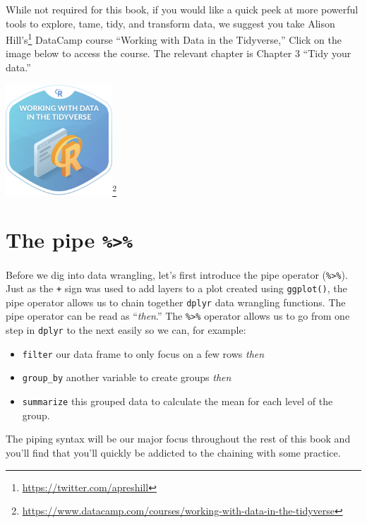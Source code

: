 \documentclass[12pt,]{krantz}
\providecommand{\tightlist}{%
  \setlength{\itemsep}{0pt}\setlength{\parskip}{0pt}}
\renewcommand{\href}[2]{#2\footnote{\url{#1}}}
\theoremstyle{definition}
\theoremstyle{definition}
\theoremstyle{definition}
\theoremstyle{remark}
\begin{document}
While not required for this book, if you would like a quick peek at more
powerful tools to explore, tame, tidy, and transform data, we suggest
you take \href{https://twitter.com/apreshill}{Alison Hill's} DataCamp
course ``Working with Data in the Tidyverse,'' Click on the image below
to access the course. The relevant chapter is Chapter 3 ``Tidy your
data.''

\begin{center}
\href{https://www.datacamp.com/courses/working-with-data-in-the-tidyverse}{\includegraphics[width=0.3\textwidth]{images/datacamp_working_with_data.png}}
\end{center}

\section{\texorpdfstring{The pipe
\texttt{\%\textgreater{}\%}}{The pipe \%\textgreater{}\%}}\label{piping}

Before we dig into data wrangling, let's first introduce the pipe
operator (\texttt{\%\textgreater{}\%}). Just as the \texttt{+} sign was
used to add layers to a plot created using \texttt{ggplot()}, the pipe
operator allows us to chain together \texttt{dplyr} data wrangling
functions. The pipe operator can be read as ``\emph{then}.'' The
\texttt{\%\textgreater{}\%} operator allows us to go from one step in
\texttt{dplyr} to the next easily so we can, for example:

\begin{itemize}
\tightlist
\item
  \texttt{filter} our data frame to only focus on a few rows \emph{then}
\item
  \texttt{group\_by} another variable to create groups \emph{then}
\item
  \texttt{summarize} this grouped data to calculate the mean for each
  level of the group.
\end{itemize}

The piping syntax will be our major focus throughout the rest of this
book and you'll find that you'll quickly be addicted to the chaining
with some practice.
\end{document}
